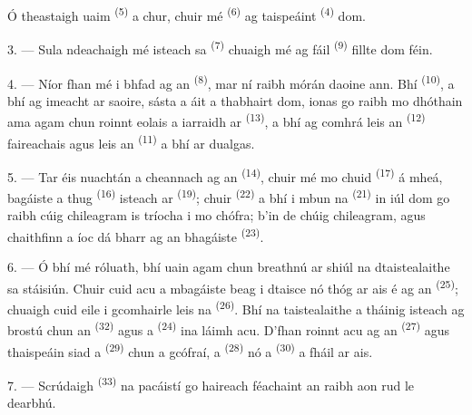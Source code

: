 Ó theastaigh uaim  \textsuperscript{(5)} a chur,
chuir mé  \textsuperscript{(6)} ag taispeáint  \textsuperscript{(4)} dom.

3. --- Sula ndeachaigh mé isteach sa  \textsuperscript{(7)}
chuaigh mé ag fáil  \textsuperscript{(9)} fillte dom féin.

4. --- Níor fhan mé i bhfad ag an  \textsuperscript{(8)}, mar
ní raibh mórán daoine ann. Bhí  \textsuperscript{(10)}, a bhí ag
imeacht ar saoire, sásta a áit a thabhairt dom, ionas go raibh mo dhóthain ama agam
chun roinnt eolais a iarraidh ar  \textsuperscript{(13)},
a bhí ag comhrá leis an  \textsuperscript{(12)} faireachais agus
leis an  \textsuperscript{(11)} a bhí ar dualgas.

\VUsaut{3.0mm}

5. --- Tar éis nuachtán a cheannach ag an 
\textsuperscript{(14)}, chuir mé mo chuid  \textsuperscript{(17)} á
mheá, bagáiste a thug  \textsuperscript{(16)} isteach ar
 \textsuperscript{(19)}; chuir 
\textsuperscript{(22)} a bhí i mbun na  \textsuperscript{(21)} in iúl dom
go raibh cúig chileagram is tríocha i mo chófra; b'in  de chúig
chileagram, agus chaithfinn a íoc dá bharr ag  an bhagáiste
\textsuperscript{(23)}.

6. --- Ó bhí mé róluath, bhí uain agam chun breathnú ar shiúl na dtaistealaithe sa
stáisiún. Chuir cuid acu a mbagáiste beag i dtaisce nó thóg ar ais é ag an
 \textsuperscript{(25)}; chuaigh cuid eile i gcomhairle
leis na  \textsuperscript{(26)}. Bhí na taistealaithe a tháinig
isteach ag brostú chun an  \textsuperscript{(32)} agus a
 \textsuperscript{(24)} ina láimh acu. D'fhan roinnt acu ag an
 \textsuperscript{(27)} agus thaispeáin siad a 
\textsuperscript{(29)} chun a gcófraí, a  \textsuperscript{(28)} nó a
 \textsuperscript{(30)} a fháil ar ais.

7. --- Scrúdaigh  \textsuperscript{(33)} na pacáistí go
haireach féachaint an raibh aon rud le dearbhú.

